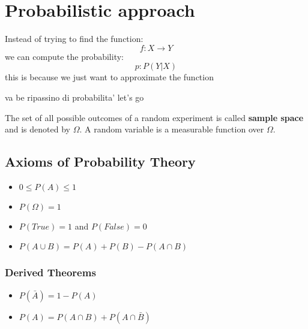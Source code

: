 % 
\chapter{Probabilistic approach}
Instead of trying to find the function:
\[
f: X \to Y
\]
we can compute the probability:
\[
  p: P(Y|X)
\]
this is because we just want to approximate the function

va be ripassino di probabilita' let's go 



The set of all possible outcomes of a random experiment is called \textbf{sample space} and is denoted by $\Omega$. A random variable is a measurable function over $\Omega$. 


\section{Axioms of Probability Theory}
\begin{itemize}
  \item $0 \leq P(A) \leq 1$
  \item $P(\Omega) = 1$
  \item $P(True)=1$ and $P(False)=0$
  \item $P(A \cup B) = P(A) + P(B) - P(A \cap B)$
\end{itemize}
\subsection{Derived Theorems}
\begin{itemize}
  \item $P(\bar{A}) = 1 - P(A)$
  \item $P(A) = P(A \cap B) + P(A \cap \bar{B})$
\end{itemize}

